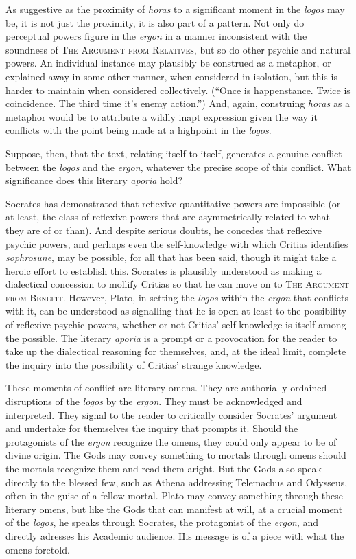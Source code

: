 As suggestive as the proximity of \emph{horas} to a significant moment in the \emph{logos} may be, it is not just the proximity, it is also part of a pattern. Not only do perceptual powers figure in the \emph{ergon} in a manner inconsistent with the soundness of \textsc{The Argument from Relatives}, but so do other psychic and natural powers. An individual instance may plausibly be construed as a metaphor, or explained away in some other manner, when considered in isolation, but this is harder to maintain when considered collectively. (``Once is happenstance. Twice is coincidence. The third time it's enemy action.'') And, again, construing \emph{horas} as a metaphor would be to attribute a wildly inapt expression given the way it conflicts with the point being made at a highpoint in the \emph{logos}.

Suppose, then, that the text, relating itself to itself, generates a genuine conflict between the \emph{logos} and the \emph{ergon}, whatever the precise scope of this conflict. What significance does this literary \emph{aporia} hold?

Socrates has demonstrated that reflexive quantitative powers are impossible (or at least, the class of reflexive powers that are asymmetrically related to what they are of or than). And despite serious doubts, he concedes that reflexive psychic powers, and perhaps even the self-knowledge with which Critias identifies \emph{sōphrosunē}, may be possible, for all that has been said, though it might take a heroic effort to establish this. Socrates is plausibly understood as making a dialectical concession to mollify Critias so that he can move on to \textsc{The Argument from Benefit}. However, Plato, in setting the \emph{logos} within the \emph{ergon} that conflicts with it, can be understood as signalling that he is open at least to the possibility of reflexive psychic powers, whether or not Critias' self-knowledge is itself among the possible. The literary \emph{aporia} is a prompt or a provocation for the reader to take up the dialectical reasoning for themselves, and, at the ideal limit, complete the inquiry into the possibility of Critias' strange knowledge. 

These moments of conflict are literary omens. They are authorially ordained disruptions of the \emph{logos} by the \emph{ergon}. They must be acknowledged and interpreted. They signal to the reader to critically consider Socrates' argument and undertake for themselves the inquiry that prompts it. Should the protagonists of the \emph{ergon} recognize the omens, they could only appear to be of divine origin. The Gods may convey something to mortals through omens should the mortals recognize them and read them aright. But the Gods also speak directly to the blessed few, such as Athena addressing Telemachus and Odysseus, often in the guise of a fellow mortal. Plato may convey something through these literary omens, but like the Gods that can manifest at will, at a crucial moment of the \emph{logos}, he speaks through Socrates, the protagonist of the \emph{ergon}, and directly adresses his Academic audience. His message is of a piece with what the omens foretold.

